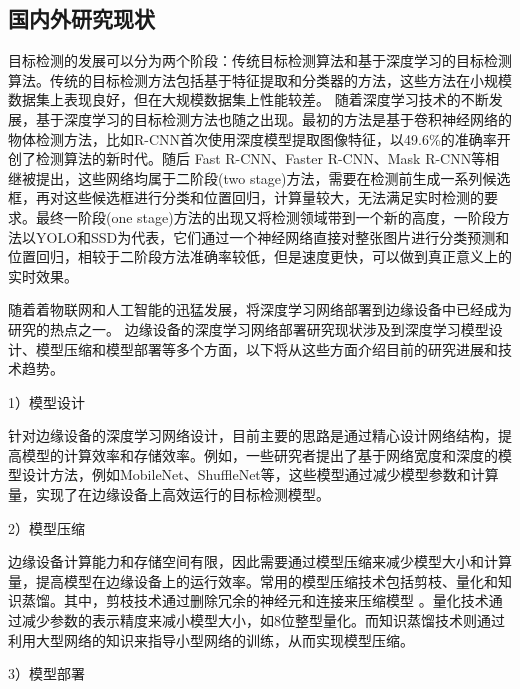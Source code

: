 \documentclass{ctexart}
\numberwithin{equation}{section}%
\numberwithin{figure}{section}%
\numberwithin{table}{section}%
\begin{document}
	\subsection{国内外研究现状}
	目标检测的发展可以分为两个阶段：传统目标检测算法和基于深度学习的目标检测算法。传统的目标检测方法包括基于特征提取和分类器的方法，这些方法在小规模数据集上表现良好，但在大规模数据集上性能较差。
	随着深度学习技术的不断发展，基于深度学习的目标检测方法也随之出现。最初的方法是基于卷积神经网络的物体检测方法，比如R-CNN\textsuperscript{\cite{article2}}首次使用深度模型提取图像特征，以49.6\%的准确率开创了检测算法的新时代。随后 Fast R-CNN\textsuperscript{\cite{article3}}、Faster R-CNN\textsuperscript{\cite{article4}}、Mask R-CNN\textsuperscript{\cite{article5}}等相继被提出，这些网络均属于二阶段(two stage)方法，需要在检测前生成一系列候选框，再对这些候选框进行分类和位置回归，计算量较大，无法满足实时检测的要求。最终一阶段(one stage)方法的出现又将检测领域带到一个新的高度，一阶段方法以YOLO\textsuperscript{\cite{article6}}\textsuperscript{\cite{article7}}\textsuperscript{\cite{article8}}和SSD\textsuperscript{\cite{article9}}为代表，它们通过一个神经网络直接对整张图片进行分类预测和位置回归，相较于二阶段方法准确率较低，但是速度更快，可以做到真正意义上的实时效果。
	
	随着着物联网和人工智能的迅猛发展，将深度学习网络部署到边缘设备中已经成为研究的热点之一。
	边缘设备的深度学习网络部署研究现状涉及到深度学习模型设计、模型压缩和模型部署等多个方面，以下将从这些方面介绍目前的研究进展和技术趋势。
	
	1）模型设计
	
	针对边缘设备的深度学习网络设计，目前主要的思路是通过精心设计网络结构，提高模型的计算效率和存储效率。例如，一些研究者提出了基于网络宽度和深度的模型设计方法，例如MobileNet\textsuperscript{\cite{6}}、ShuffleNet\textsuperscript{\cite{7}}等，这些模型通过减少模型参数和计算量，实现了在边缘设备上高效运行的目标检测模型。
	
	2）模型压缩
	
	边缘设备计算能力和存储空间有限，因此需要通过模型压缩来减少模型大小和计算量，提高模型在边缘设备上的运行效率。常用的模型压缩技术包括剪枝、量化和知识蒸馏。其中，剪枝技术通过删除冗余的神经元和连接来压缩模型 \textsuperscript{\cite{8}}。量化技术通过减少参数的表示精度来减小模型大小，如8位整型量化\textsuperscript{\cite{9}}。而知识蒸馏技术则通过利用大型网络的知识来指导小型网络的训练，从而实现模型压缩\textsuperscript{\cite{10}}。
	
	3）模型部署
	
\end{document}
